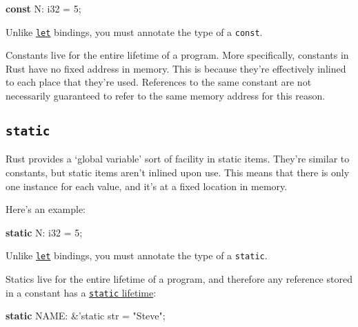 \documentclass[a4paper,]{book}
\newenvironment{Shaded}{\begin{snugshade}}{\end{snugshade}}
\newcommand{\KeywordTok}[1]{\textcolor[rgb]{0.13,0.29,0.53}{\textbf{{#1}}}}
\newcommand{\DataTypeTok}[1]{\textcolor[rgb]{0.13,0.29,0.53}{{#1}}}
\newcommand{\DecValTok}[1]{\textcolor[rgb]{0.00,0.00,0.81}{{#1}}}
\newcommand{\StringTok}[1]{\textcolor[rgb]{0.31,0.60,0.02}{{#1}}}
\newcommand{\OtherTok}[1]{\textcolor[rgb]{0.56,0.35,0.01}{{#1}}}
\newcommand{\NormalTok}[1]{{#1}}
\begin{document}
\begin{Shaded}
\begin{Highlighting}[]
\KeywordTok{const} \NormalTok{N: }\DataTypeTok{i32} \NormalTok{= }\DecValTok{5}\NormalTok{;}
\end{Highlighting}
\end{Shaded}

Unlike \protect\hyperlink{sec--variable-bindings}{\texttt{let}}
bindings, you must annotate the type of a \texttt{const}.

Constants live for the entire lifetime of a program. More specifically,
constants in Rust have no fixed address in memory. This is because
they're effectively inlined to each place that they're used. References
to the same constant are not necessarily guaranteed to refer to the same
memory address for this reason.

\subsection{\texorpdfstring{\texttt{static}}{static}}\label{static-1}

Rust provides a `global variable' sort of facility in static items.
They're similar to constants, but static items aren't inlined upon use.
This means that there is only one instance for each value, and it's at a
fixed location in memory.

Here's an example:

\begin{Shaded}
\begin{Highlighting}[]
\KeywordTok{static} \NormalTok{N: }\DataTypeTok{i32} \NormalTok{= }\DecValTok{5}\NormalTok{;}
\end{Highlighting}
\end{Shaded}

Unlike \protect\hyperlink{sec--variable-bindings}{\texttt{let}}
bindings, you must annotate the type of a \texttt{static}.

Statics live for the entire lifetime of a program, and therefore any
reference stored in a constant has a
\protect\hyperlink{sec--lifetimes}{\texttt{\textquotesingle{}static}
lifetime}:

\begin{Shaded}
\begin{Highlighting}[]
\KeywordTok{static} \NormalTok{NAME: &}\OtherTok{'static} \DataTypeTok{str} \NormalTok{= }\StringTok{"Steve"}\NormalTok{;}
\end{Highlighting}
\end{Shaded}
\end{document}
